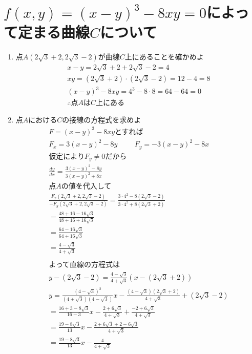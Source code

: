 \documentclass[a4paper,10pt]{jarticle}
\begin{document}
\section{$f(x,y) = (x-y)^3-8xy=0$によって定まる曲線$C$について}
\begin{enumerate}
\item 点$A(2\sqrt{3}+2,2\sqrt{3}-2)$が曲線$C$上にあることを確かめよ\begin{gather*}
	x-y=2\sqrt{3}+2 + 2\sqrt{3}-2 = 4\\
	xy = (2\sqrt{3}+2) \cdot (2\sqrt{3}-2) = 12 - 4 = 8\\
	(x-y)^3-8xy = 4^3 - 8 \cdot 8 = 64 - 64 = 0 \\
	\therefore \text{点}A\text{は}C\text{上にある}
\end{gather*}
\item 点$A$における$C$の接線の方程式を求めよ\begin{gather*}
	F = (x-y)^3-8xy\text{とすれば}\\
	F_x = 3(x-y)^2-8y \hspace{1cm} F_y= -3(x-y)^2-8x \\
	\text{仮定により}F_y \neq 0 \text{だから} \\
	\frac{dy}{dx} = \frac{3(x-y)^2-8y}{3(x-y)^2+8x}\\
	\text{点$A$の値を代入して} \\
	\frac{F_x(2\sqrt{3}+2,2\sqrt{3}-2)}{-F_y(2\sqrt{3}+2,2\sqrt{3}-2)}
		=\frac{3 \cdot 4^2 - 8(2\sqrt{3}-2)}{3 \cdot 4^2 + 8(2\sqrt{3}+2)} \\
	=\frac{48+16-16\sqrt{3}}{48+16+16\sqrt{3}} \\
	=\frac{64-16\sqrt{3}}{64+16\sqrt{3}} \\
	=\frac{4-\sqrt{3}}{4+\sqrt{3}}\\\\
	\text{よって直線の方程式は}\\
	y - (2\sqrt{3}-2) = \frac{4-\sqrt{3}}{4+\sqrt{3}} (x - (2\sqrt{3}+2))\\
	y= \frac{(4-\sqrt{3})^2}{(4+\sqrt{3})(4-\sqrt{3})}x-\frac{(4-\sqrt{3})(2\sqrt{3}+2)}{4+\sqrt{3}}+(2\sqrt{3}-2)\\
	= \frac{16+3-8\sqrt{3}}{16-3}x-\frac{2+6\sqrt{3}}{4+\sqrt{3}}+\frac{-2+6\sqrt{3}}{4+\sqrt{3}}\\
	=\frac{19-8\sqrt{3}}{13}x-\frac{2+6\sqrt{3}+2-6\sqrt{3}}{4+\sqrt{3}}\\
	=\frac{19-8\sqrt{3}}{13}x-\frac{4}{4+\sqrt{3}}
\end{gather*}
\end{enumerate}
\end{document}
